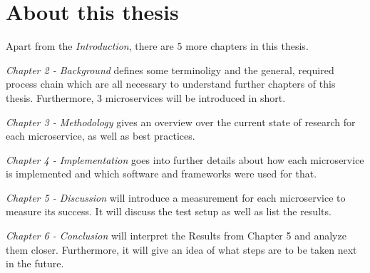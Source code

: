 \section{About this thesis}
Apart from the \emph{Introduction}, there are 5 more chapters in this thesis.

\emph{Chapter 2 - Background} defines some terminoligy and the general, required process chain which are all necessary to understand further chapters of this thesis. Furthermore, 3 microservices will be introduced in short.

\emph{Chapter 3 - Methodology} gives an overview over the current state of research for each microservice, as well as best practices. 

\emph{Chapter 4 - Implementation} goes into further details about how each microservice is implemented and which software and frameworks were used for that.

\emph{Chapter 5 - Discussion} will introduce a measurement for each microservice to measure its success. It will discuss the test setup as well as list the results.

\emph{Chapter 6 - Conclusion} will interpret the Results from Chapter 5 and analyze them closer. Furthermore, it will give an idea of what steps are to be taken next in the future.